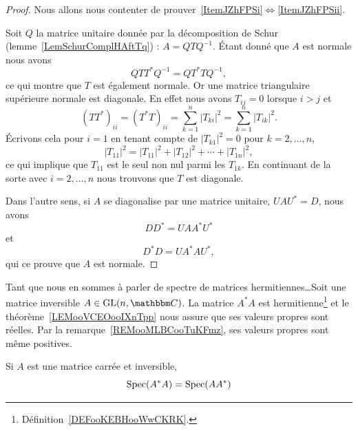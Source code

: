\begin{proof}
    Nous allons nous contenter de prouver~\ref{ItemJZhFPSi}\( \Leftrightarrow\)\ref{ItemJZhFPSii}.

    Soit \( Q\) la matrice unitaire donnée par la décomposition de Schur (lemme~\ref{LemSchurComplHAftTq}) : \( A=QTQ^{-1}\). Étant donné que \( A\) est normale nous avons
    \begin{equation}
        QTT^*Q^{-1}=QT^*TQ^{-1},
    \end{equation}
    ce qui montre que \( T\) est également normale. Or une matrice triangulaire supérieure normale est diagonale. En effet nous avons \( T_{ij}=0\) lorsque \( i>j\) et
    \begin{equation}
        (TT^*)_{ii}=(T^*T)_{ii}=\sum_{k=1}^n| T_{ki} |^2=\sum_{k=1}^n| T_{ik} |^2.
    \end{equation}
    Écrivons cela pour \( i=1\) en tenant compte de \( | T_{k1} |^2=0\) pour \( k=2,\ldots, n\),
    \begin{equation}
        | T_{11} |^2=| T_{11} |^2+| T_{12} |^2+\cdots+| T_{1n} |^2,
    \end{equation}
    ce qui implique que \( T_{11}\) est le seul non nul parmi les \( T_{1k}\). En continuant de la sorte avec \( i=2,\ldots, n\) nous trouvons que \( T\) est diagonale.

    Dans l'autre sens, si \( A\) se diagonalise par une matrice unitaire, \( UAU^*=D\), nous avons
    \begin{equation}
        DD^*=UAA^*U^*
    \end{equation}
    et
    \begin{equation}
        D^*D=UA^*AU^*,
    \end{equation}
    qui ce prouve que \( A\) est normale.
\end{proof}

Tant que nous en sommes à parler de spectre de matrices hermitiennes\ldots Soit une matrice inversible \( A\in \GL(n,\eC)\). La matrice \( A^*A\) est hermitienne\footnote{Définition~\ref{DEFooKEBHooWwCKRK}.} et le théorème~\ref{LEMooVCEOooIXnTpp} nous assure que ses valeurs propres sont réelles. Par la remarque~\ref{REMooMLBCooTuKFmz}, ses valeurs propres sont même positives.

\begin{lemma}   \label{LEMooHUGEooVYhZdZ}
    Si \( A\) est une matrice carrée et inversible,
    \begin{equation}
        \operatorname{Spec}(A^*A)=\operatorname{Spec}(AA^*)
    \end{equation}
\end{lemma}

